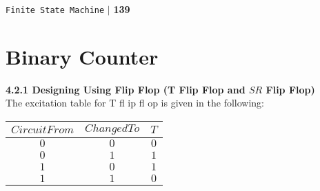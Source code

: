 \documentclass[9pt]{beamer}
\begin{document}
\begin{frame}
\begin{flushright}
\texttt{Finite State Machine} \hspace*{0.10cm}\textbf{$|$} \textbf{139}\hspace*{0.5cm}
\end{flushright}

\section*{Binary Counter}

\vspace*{0.5cm}
\textbf{4.2.1 Designing Using Flip Flop (T Flip Flop and $SR$ Flip Flop)}\\

\vspace*{0.2cm}
The excitation table for T fl ip fl op is given in the following:

\pause
\begin{center}
\begin{tabular}{ccc}
 \hline

 \hline

 \hline

 \hline
 $Circuit From$ &  $Changed To$ & $T$\\
\hline
 $0$    &    $0$    &   $0$  \\
 $0$    &    $1$    &   $1$  \\
 $1$    &    $0$    &   $1$  \\
 $1$    &    $1$    &   $0$  \\
 \hline

 \hline

 \hline

 \hline
\end{tabular}
\end{center}
\end{frame}
\end{document}
